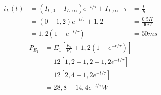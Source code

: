\documentclass{article}
\begin{document}
\begin{enumerate}[label=\protect\circled{\arabic*}]
\begin{center}
    \end{center}
    \begin{align*}
        i_L(t) &= \left(I_{L,0} - I_{L,\infty}\right)e^{-t/\tau} + I_{L, \infty} & \tau &= \frac{L}{R} \\
        &= (0-1,2)e^{-t/\tau} + 1,2 & &=\frac{0,5H}{10\Omega}\\
        &=1,2(1-e^{-t/\tau}) & &=50ms
    \end{align*}
    \begin{align*}
        P_{E_1} &= E_1 \left[\frac{E_1}{R_1}+1,2(1-e^{-t/\tau})\right]\\
        &=12[1,2+1,2 - 1,2e^{-t/\tau}]\\
        &= 12[2,4 - 1,2e^{-t/\tau}]\\
        &=28,8 - 14,4 e^{-t/\tau} W
    \end{align*}
\end{enumerate}
\end{document}
